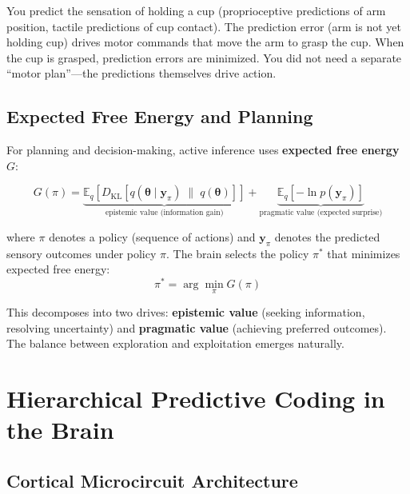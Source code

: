 \documentclass[11pt,a4paper]{report}
\begin{document}
\begin{examplebox}
You predict the sensation of holding a cup (proprioceptive predictions of arm position, tactile predictions of cup contact). The prediction error (arm is not yet holding cup) drives motor commands that move the arm to grasp the cup. When the cup is grasped, prediction errors are minimized. You did not need a separate ``motor plan''---the predictions themselves drive action.
\end{examplebox}

\section{Expected Free Energy and Planning}

For planning and decision-making, active inference uses \textbf{expected free energy} $G$:

\begin{mathbox}
\vspace{-6pt}
\[
  G(\pi) = \underbrace{\mathbb{E}_{q}\!\left[D_{\mathrm{KL}}\!\left[q(\boldsymbol{\theta} \mid \mathbf{y}_\pi) \;\|\; q(\boldsymbol{\theta})\right]\right]}_{\text{epistemic value (information gain)}} + \underbrace{\mathbb{E}_{q}\!\left[-\ln p(\mathbf{y}_\pi)\right]}_{\text{pragmatic value (expected surprise)}}
\]
\vspace{-8pt}
\end{mathbox}

where $\pi$ denotes a policy (sequence of actions) and $\mathbf{y}_\pi$ denotes the predicted sensory outcomes under policy $\pi$. The brain selects the policy $\pi^*$ that minimizes expected free energy:
\[
  \pi^* = \arg\min_\pi G(\pi)
\]

This decomposes into two drives: \textbf{epistemic value} (seeking information, resolving uncertainty) and \textbf{pragmatic value} (achieving preferred outcomes). The balance between exploration and exploitation emerges naturally.


\chapter{Hierarchical Predictive Coding in the Brain}

\section{Cortical Microcircuit Architecture}
\end{document}
